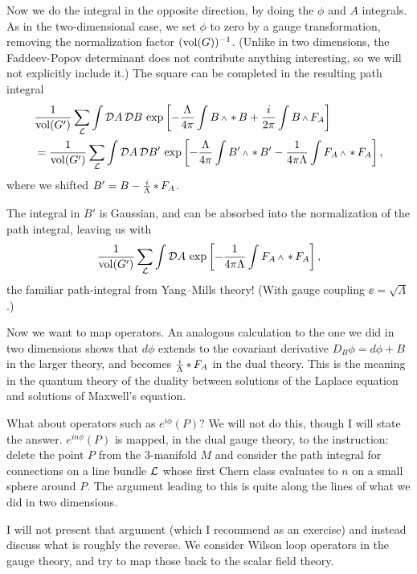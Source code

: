 Now we do the integral in the opposite direction, by doing the $\phi$ and $A$
integrals.  As in the two-dimensional case, we set $\phi$ to zero by a gauge
transformation, removing the normalization factor $(\operatorname{\rm vol}(G))^{-1}$.  (Unlike
in two dimensions, the Faddeev-Popov determinant does not contribute anything
interesting, so we will not explicitly include it.)  The square can be
completed in the resulting path integral
\begin{equation}
\begin{align}
&\frac1{\vol(G')}\sum_{\lb}\int\cD A\,\cD B\,
\exp\left[-\frac{\Lambda}{4\pi}\int  B\wdg\hstar B
+ \frac{i}{2\pi}\int B\wdg F_A\right]
\\&=
\frac1{\vol(G')}\sum_{\lb}\int\cD A\,\cD B'\,
\exp\left[-\frac{\Lambda}{4\pi}\int  B'\wdg\hstar B'
-\frac1{4\pi\Lambda}\int F_A\wdg\hstar F_A\right],
\end{align}
\end{equation}
where we shifted $B'=B-\frac{i}{\Lambda}\mathop{*} F_A$.

\noindent
The integral in $B'$ is Gaussian, and can be absorbed into the normalization
of the path integral, leaving us with
\begin{equation}
\frac1{\vol(G')}\sum_{\lb}\int\cD A\,
\exp\left[
-\frac1{4\pi\Lambda}\int F_A\wdg\hstar F_A\right],
\end{equation}
the familiar path-integral from Yang--Mills theory!  (With gauge coupling
$\ee=\sqrt{\Lambda}$.)

Now we want to map operators.  An analogous calculation to the one we did in
two dimensions shows that $d\phi$ extends to the covariant derivative
$D_B\phi=d\phi+B$ in the larger theory, and becomes
$\frac{i}{\Lambda}\mathop{*} F_A$ in the dual theory.
This is the meaning in the quantum theory of the duality between solutions
of the Laplace equation and solutions of Maxwell's equation.

What about  operators such as $e^{i\phi}(P)$?  We will not do this, though
I will state the answer. $e^{in\phi}(P)$ is mapped, in the dual gauge theory,
to the instruction: delete the point $P$ from the 3-manifold $M$ and consider
the path integral for connections on a line bundle ${\cal L}$ whose
first Chern class evaluates to $n$ on a small sphere around $P$.  The argument
leading to this is quite along the lines of what we did in two dimensions.

I will not present that argument (which I recommend as an exercise)
and instead discuss what is roughly the reverse.  We
consider Wilson loop operators in the gauge theory, and try to map those
back to the scalar field theory.

